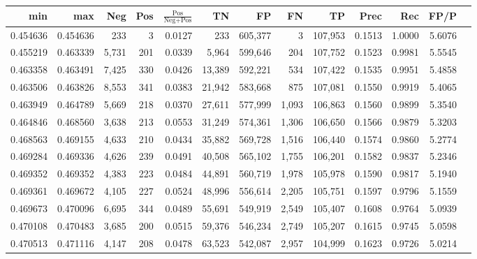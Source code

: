 \begin{tabular}{rrrrrrrrrrrrr}
\toprule
     min &      max &   Neg &   Pos & $\frac{\text{Pos}}{\text{Neg}+\text{Pos}}$ &      TN &      FP &      FN &      TP &   Prec &    Rec &   FP/P \\
\midrule
0.454636 & 0.454636 &   233 &     3 &                                     0.0127 &     233 & 605,377 &       3 & 107,953 & 0.1513 & 1.0000 & 5.6076 \\
0.455219 & 0.463339 & 5,731 &   201 &                                     0.0339 &   5,964 & 599,646 &     204 & 107,752 & 0.1523 & 0.9981 & 5.5545 \\
0.463358 & 0.463491 & 7,425 &   330 &                                     0.0426 &  13,389 & 592,221 &     534 & 107,422 & 0.1535 & 0.9951 & 5.4858 \\
0.463506 & 0.463826 & 8,553 &   341 &                                     0.0383 &  21,942 & 583,668 &     875 & 107,081 & 0.1550 & 0.9919 & 5.4065 \\
0.463949 & 0.464789 & 5,669 &   218 &                                     0.0370 &  27,611 & 577,999 &   1,093 & 106,863 & 0.1560 & 0.9899 & 5.3540 \\
0.464846 & 0.468560 & 3,638 &   213 &                                     0.0553 &  31,249 & 574,361 &   1,306 & 106,650 & 0.1566 & 0.9879 & 5.3203 \\
0.468563 & 0.469155 & 4,633 &   210 &                                     0.0434 &  35,882 & 569,728 &   1,516 & 106,440 & 0.1574 & 0.9860 & 5.2774 \\
0.469284 & 0.469336 & 4,626 &   239 &                                     0.0491 &  40,508 & 565,102 &   1,755 & 106,201 & 0.1582 & 0.9837 & 5.2346 \\
0.469352 & 0.469352 & 4,383 &   223 &                                     0.0484 &  44,891 & 560,719 &   1,978 & 105,978 & 0.1590 & 0.9817 & 5.1940 \\
0.469361 & 0.469672 & 4,105 &   227 &                                     0.0524 &  48,996 & 556,614 &   2,205 & 105,751 & 0.1597 & 0.9796 & 5.1559 \\
0.469673 & 0.470096 & 6,695 &   344 &                                     0.0489 &  55,691 & 549,919 &   2,549 & 105,407 & 0.1608 & 0.9764 & 5.0939 \\
0.470108 & 0.470483 & 3,685 &   200 &                                     0.0515 &  59,376 & 546,234 &   2,749 & 105,207 & 0.1615 & 0.9745 & 5.0598 \\
0.470513 & 0.471116 & 4,147 &   208 &                                     0.0478 &  63,523 & 542,087 &   2,957 & 104,999 & 0.1623 & 0.9726 & 5.0214 \\

\end{tabular}
